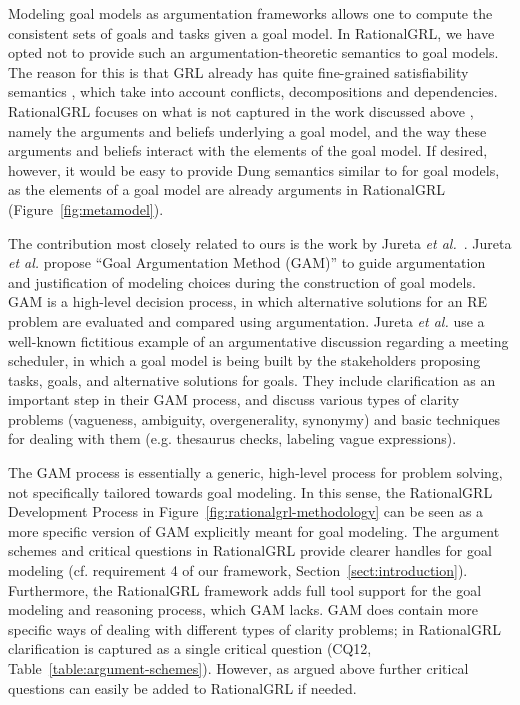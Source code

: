 Modeling goal models as argumentation frameworks allows one to compute the consistent sets of goals and tasks given a goal model. In RationalGRL, we have opted not to provide such an argumentation-theoretic semantics to goal models. The reason for this is that GRL already has quite fine-grained satisfiability semantics \cite{Amyot:2010:EGM:1841349.1841356}, which take into account conflicts, decompositions and dependencies. RationalGRL focuses on what is not captured in the work discussed above \cite{bagheri2011consolidating,MirbelVillata12}, namely the arguments and beliefs underlying a goal model, and the way these arguments and beliefs interact with the elements of the goal model. If desired, however, it would be easy to provide Dung semantics similar to \cite{bagheri2011consolidating,MirbelVillata12} for goal models, as the elements of a goal model are already arguments in RationalGRL (Figure~\ref{fig:metamodel}). 

The contribution most closely related to ours is the work by Jureta \emph{et al.}~\cite{Jureta:RE2008}. Jureta \emph{et al.} propose ``Goal Argumentation Method (GAM)'' to guide argumentation and justification of modeling choices during the construction of goal models. GAM is a high-level decision process, in which alternative solutions for an RE problem are evaluated and compared using argumentation. Jureta \emph{et al.} use a well-known fictitious example of an argumentative discussion regarding a meeting scheduler, in which a goal model is being built by the stakeholders proposing tasks, goals, and alternative solutions for goals. They include clarification as an important step in their GAM process, and discuss various types of clarity problems (vagueness, ambiguity, overgenerality, synonymy) and basic techniques for dealing with them (e.g. thesaurus checks, labeling vague expressions). 

The GAM process is essentially a generic, high-level process for problem solving, not specifically tailored towards goal modeling. In this sense, the RationalGRL Development Process in Figure~\ref{fig:rationalgrl-methodology} can be seen as a more specific version of GAM explicitly meant for goal modeling. The argument schemes and critical questions in RationalGRL provide clearer handles for goal modeling (cf. requirement 4 of our framework, Section~\ref{sect:introduction}). Furthermore, the RationalGRL framework adds full tool support for the goal modeling and reasoning process, which GAM lacks. GAM does contain more specific ways of dealing with different types of clarity problems; in RationalGRL clarification is captured as a single critical question (CQ12, Table~\ref{table:argument-schemes}). However, as argued above further critical questions can easily be added to RationalGRL if needed.

